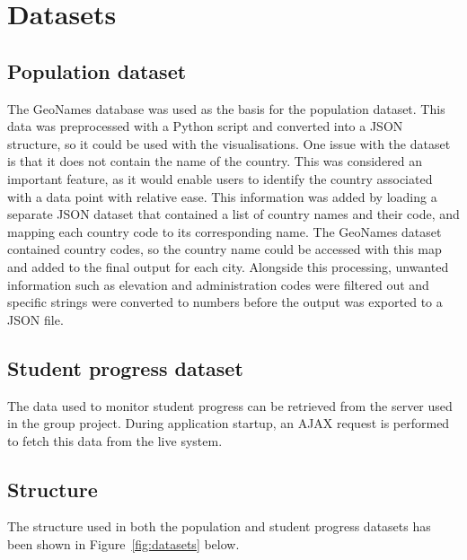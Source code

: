 \section{Datasets} {
\label{sec:datasets}

	\subsection{Population dataset} {
	\label{sec:population_dataset}

		The GeoNames database was used as the basis for the population dataset. This data was preprocessed with a Python script and converted into a JSON structure, so it could be used with the visualisations. One issue with the dataset is that it does not contain the name of the country. This was considered an important feature, as it would enable users to identify the country associated with a data point with relative ease. This information was added by loading a separate JSON dataset that contained a list of country names and their code, and mapping each country code to its corresponding name. The GeoNames dataset contained country codes, so the country name could be accessed with this map and added to the final output for each city. Alongside this processing, unwanted information such as elevation and administration codes were filtered out and specific strings were converted to numbers before the output was exported to a JSON file.

	}

	\subsection{Student progress dataset} {
	\label{sec:student_progress_dataset}

		The data used to monitor student progress can be retrieved from the server used in the group project. During application startup, an AJAX request is performed to fetch this data from the live system.

	}

	\subsection{Structure} {
	\label{sec:dataset_structure}

		The structure used in both the population and student progress datasets has been shown in Figure~\ref{fig:datasets} below.

		

	}

}


